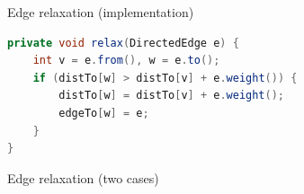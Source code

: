 \documentclass[8pt,a4paper,compress]{beamer}
\begin{document}
\begin{frame}[fragile]
\pause

Edge relaxation (implementation)
\begin{lstlisting}[language=Java]
private void relax(DirectedEdge e) {
    int v = e.from(), w = e.to();
    if (distTo[w] > distTo[v] + e.weight()) {
        distTo[w] = distTo[v] + e.weight();
        edgeTo[w] = e;
    }
}
\end{lstlisting}

\pause
\bigskip

Edge relaxation (two cases)
\begin{center}
\end{center}
\end{frame}
\end{document}
